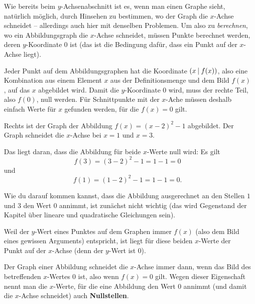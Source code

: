 \documentclass[../../main.tex]{subfiles}
\begin{document}
Wie bereits beim $y$-Achsenabschnitt ist es, wenn man einen Graphe sieht, natürlich möglich, durch Hinsehen zu bestimmen, wo der Graph die $x$-Achse schneidet -- allerdings auch hier mit denselben Problemen. Um also zu \emph{berechnen}, wo ein Abbildungsgraph die $x$-Achse schneidet, müssen Punkte berechnet werden, deren $y$-Koordinate $0$ ist (das ist die Bedingung dafür, dass ein Punkt auf der $x$-Achse liegt).

Jeder Punkt auf dem Abbildungsgraphen hat die Koordinate $\left(x \:\middle|\: f(x)\right)$, also eine Kombination aus einem Element $x$ aus der Definitionsmenge und dem Bild $f(x)$, auf das $x$ abgebildet wird. Damit die $y$-Koordinate $0$ wird, muss der rechte Teil, also $f(0)$, null werden. Für Schnittpunkte mit der $x$-Ache müssen deshalb einfach Werte für $x$ gefunden werden, für die $f(x)=0$ gilt.

\begin{example}
    Rechts ist der Graph der Abbildung $f(x)=(x-2)^2-1$ abgebildet. Der Graph schneidet die $x$-Achse bei $x=1$ und $x=3$. 
    
    Das liegt daran, dass die Abbildung für beide $x$-Werte null wird: Es gilt \[f(3)=(3-2)^2-1=1-1=0\] und \[f(1)=(1-2)^2-1=1-1=0.\]
    
    Wie du darauf kommen kannst, dass die Abbildung ausgerechnet an den Stellen $1$ und $3$ den Wert $0$ annimmt, ist zunächst nicht wichtig (das wird Gegenstand der Kapitel über lineare und quadratische Gleichungen sein).
    
    Weil der $y$-Wert eines Punktes auf dem Graphen immer $f(x)$ (also dem Bild eines gewissen Arguments) entspricht, ist liegt für diese beiden $x$-Werte der Punkt auf der $x$-Achse (denn der $y$-Wert ist $0$).
\end{example}

Der Graph einer Abbildung schneidet die $x$-Achse immer dann, wenn das Bild des betreffenden $x$-Wertes $0$ ist, also wenn $f(x)=0$ gilt. Wegen dieser Eigenschaft nennt man die $x$-Werte, für die eine Abbildung den Wert $0$ annimmt (und damit die $x$-Achse schneidet) auch \textbf{Nullstellen}.
\end{document}
